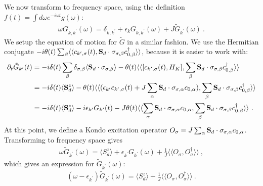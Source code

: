 We now transform to frequency space, using the definition \(f(t) = \int d\omega e^{-i\omega t} g(\omega)\):
\begin{equation}\begin{aligned}\label{GkkFrequency}
	\omega G_{k,k^\prime}(\omega) = \delta_{k,k^\prime} + \epsilon_k G_{k,k^\prime}(\omega) + J\tilde G_{k^\prime}(\omega)~.
\end{aligned}\end{equation}
We setup the equation of motion for \(\tilde G\) in a similar fashion. We use the Hermitian conjugate \(-i\theta(t)\sum_\beta \langle \langle c_{k^\prime,\sigma}(t), {\bf S}_d\cdot \sigma_{\sigma,\beta} c^\dagger_{0,\beta} \rangle  \rangle\), because it is easier to work with:
\begin{equation}\begin{aligned}
	\partial_t\tilde G_{k^\prime}(t) &= -i\delta(t)\sum_\beta \delta_{\sigma,\beta} \langle {\bf S}_d\cdot \sigma_{\sigma,\beta} \rangle - \theta(t)\langle \langle [c_{k^\prime,\sigma}(t), H_K], \sum_\beta {\bf S}_d\cdot \sigma_{\sigma,\beta} c^\dagger_{0,\beta} \rangle  \rangle\\
									 &=-i\delta(t)\langle {\bf S}^z_d \rangle - \theta(t) \langle \langle (\epsilon_{k^\prime} c_{k^\prime,\sigma}(t) + J\sum_{\alpha} {\bf S}_d\cdot \sigma_{\sigma,\alpha} c_{0,\alpha}), \sum_\beta {\bf S}_d\cdot \sigma_{\sigma,\beta} c^\dagger_{0,\beta} \rangle  \rangle\\
									 &=-i\delta(t)\langle {\bf S}^z_d \rangle -i \epsilon_{k^\prime} G_{k^\prime}(t) - J \theta(t) \langle \langle \sum_{\alpha} {\bf S}_d\cdot \sigma_{\sigma,\alpha} c_{0,\alpha}, \sum_\beta {\bf S}_d\cdot \sigma_{\sigma,\beta} c^\dagger_{0,\beta} \rangle  \rangle~.
\end{aligned}\end{equation}
At this point, we define a Kondo excitation operator \(O_\sigma = J\sum_{\alpha} {\bf S}_d\cdot \sigma_{\sigma,\alpha} c_{0,\alpha}\). Transforming to frequency space gives
\begin{equation}\begin{aligned}
	\omega \tilde G_{k^\prime}(\omega) = \langle S_d^z \rangle + \epsilon_{k^\prime} G_{k^\prime}(\omega)  + \frac{1}{J} \langle \langle O_\sigma, O^\dagger_\sigma \rangle  \rangle ~,
\end{aligned}\end{equation}
which gives an expression for \(\tilde G_{k^\prime}(\omega)\):
\begin{equation}\begin{aligned}
	(\omega - \epsilon_{k^\prime})\tilde G_{k^\prime}(\omega) = \langle S_d^z \rangle + \frac{1}{J} \langle \langle O_\sigma, O^\dagger_\sigma \rangle  \rangle~.
\end{aligned}\end{equation}
